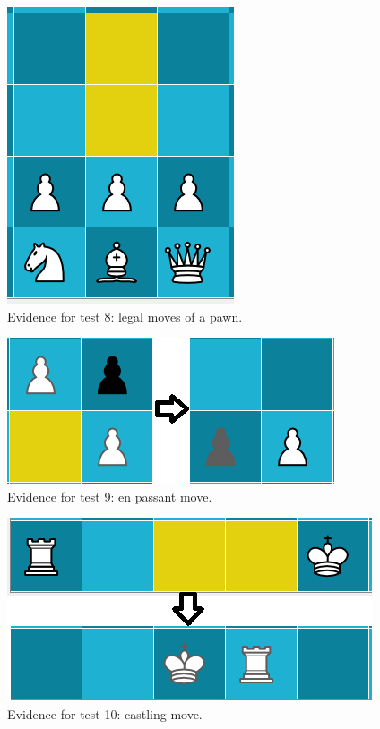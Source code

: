 \documentclass[twoside, 12pt]{report}
\begin{document}
\begin{figure}[H]
	\centering
	\includegraphics{images/screenshots/test-8}
	\caption{Evidence for test 8: legal moves of a pawn.}
	\label{test-8}
\end{figure}
\begin{figure}[H]
	\centering
	\includegraphics{images/screenshots/test-9}
	\caption{Evidence for test 9: en passant move.}
	\label{test-9}
\end{figure}
\begin{figure}[H]
	\centering
	\includegraphics{images/screenshots/test-10}
	\caption{Evidence for test 10: castling move.}
	\label{test-10}
\end{figure}
\end{document}
